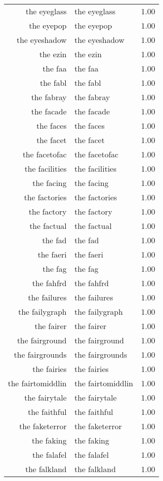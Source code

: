 \begin{table}[ht]
\begin{tabular}{rlr}
  the eyeglass & the eyeglass & 1.00 \\ 
  the eyepop & the eyepop & 1.00 \\ 
  the eyeshadow & the eyeshadow & 1.00 \\ 
  the ezin & the ezin & 1.00 \\ 
  the faa & the faa & 1.00 \\ 
  the fabl & the fabl & 1.00 \\ 
  the fabray & the fabray & 1.00 \\ 
  the facade & the facade & 1.00 \\ 
  the faces & the faces & 1.00 \\ 
  the facet & the facet & 1.00 \\ 
  the facetofac & the facetofac & 1.00 \\ 
  the facilities & the facilities & 1.00 \\ 
  the facing & the facing & 1.00 \\ 
  the factories & the factories & 1.00 \\ 
  the factory & the factory & 1.00 \\ 
  the factual & the factual & 1.00 \\ 
  the fad & the fad & 1.00 \\ 
  the faeri & the faeri & 1.00 \\ 
  the fag & the fag & 1.00 \\ 
  the fahfrd & the fahfrd & 1.00 \\ 
  the failures & the failures & 1.00 \\ 
  the failygraph & the failygraph & 1.00 \\ 
  the fairer & the fairer & 1.00 \\ 
  the fairground & the fairground & 1.00 \\ 
  the fairgrounds & the fairgrounds & 1.00 \\ 
  the fairies & the fairies & 1.00 \\ 
  the fairtomiddlin & the fairtomiddlin & 1.00 \\ 
  the fairytale & the fairytale & 1.00 \\ 
  the faithful & the faithful & 1.00 \\ 
  the faketerror & the faketerror & 1.00 \\ 
  the faking & the faking & 1.00 \\ 
  the falafel & the falafel & 1.00 \\ 
  the falkland & the falkland & 1.00 \\ 

\end{tabular}
\end{table}

